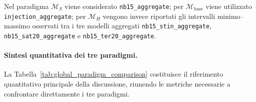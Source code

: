 Nel paradigma $\mathcal{M}_{S}$ viene considerato \texttt{nb15\_aggregate}; per $\mathcal{M}_{\mathrm{base}}$ viene utilizzato \newline \texttt{injection\_aggregate}; per $\mathcal{M}_{H}$ vengono invece riportati gli intervalli minimo--massimo osservati tra i tre modelli aggregati \texttt{nb15\_stin\_aggregate}, \texttt{nb15\_sat20\_aggregate} e \newline \texttt{nb15\_ter20\_aggregate}.

\paragraph{Sintesi quantitativa dei tre paradigmi.}
La Tabella~\ref{tab:global_paradigm_comparison} costituisce il riferimento quantitativo principale della discussione, riunendo le metriche necessarie a confrontare direttamente i tre paradigmi.

